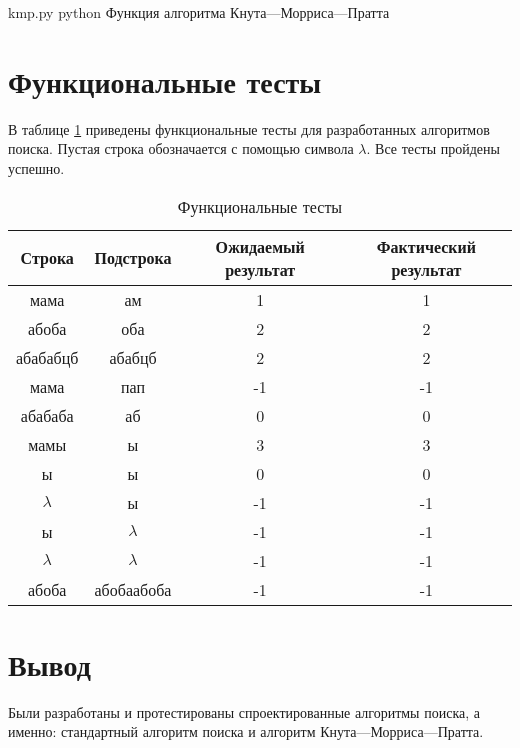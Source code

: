 \clearpage

{kmp.py} %
{python} %
{Функция алгоритма Кнута---Морриса---Пратта} %

\clearpage

\section{Функциональные тесты}

В таблице \ref{tbl:func_tests} приведены функциональные тесты для разработанных алгоритмов поиска. Пустая строка обозначается с помощью символа $\lambda$. Все тесты пройдены успешно.

\begin{table}[ht]
	\small
	\begin{center}
		\begin{threeparttable}
			\caption{Функциональные тесты}
			\label{tbl:func_tests}
			\begin{tabular}{|c|c|c|c|}
				\hline
				\bfseries Строка
				& \bfseries Подстрока
				& \bfseries Ожидаемый результат
				& \bfseries Фактический результат \\ 
				\hline
				мама & ам & 1 & 1\\
				\hline
				абоба & оба & 2 & 2\\
				\hline
				абабабцб & абабцб & 2 & 2\\
				\hline
				мама & пап & -1 & -1\\
				\hline
				абабаба & аб & 0 & 0\\
				\hline
				мамы & ы & 3 & 3\\
				\hline
				ы & ы & 0 & 0\\
				\hline
				$\lambda$ & ы & -1 & -1\\
				\hline
				ы & $\lambda$ & -1 & -1\\
				\hline
				$\lambda$ & $\lambda$ & -1 & -1\\
				\hline
				абоба & абобаабоба & -1 & -1\\
				\hline
			\end{tabular}	
		\end{threeparttable}	
	\end{center}
\end{table}


\section*{Вывод}
Были разработаны и протестированы спроектированные алгоритмы поиска, а именно: стандартный алгоритм поиска и алгоритм Кнута---Морриса---Пратта.